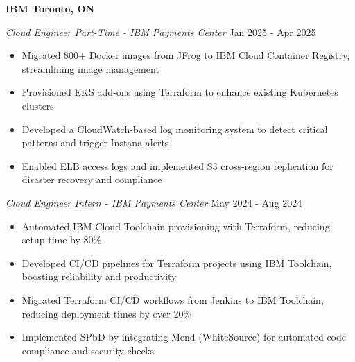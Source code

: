 \textbf{IBM \hfill Toronto, ON}\par
\textit{Cloud Engineer Part-Time - IBM Payments Center} \hfill Jan 2025 - Apr 2025

\begin{itemize}
  \item Migrated 800+ Docker images from JFrog to IBM Cloud Container Registry, streamlining image management
  \item Provisioned EKS add-ons using Terraform to enhance existing Kubernetes clusters
  \item Developed a CloudWatch-based log monitoring system to detect critical patterns and trigger Instana alerts
  \item Enabled ELB access logs and implemented S3 cross-region replication for disaster recovery and compliance
\end{itemize}
\vspace{0.1cm} \par

\textit{Cloud Engineer Intern - IBM Payments Center} \hfill May 2024 - Aug 2024

\begin{itemize}
  \item Automated IBM Cloud Toolchain provisioning with Terraform, reducing setup time by 80\%
  \item Developed CI/CD pipelines for Terraform projects using IBM Toolchain, boosting reliability and productivity
  \item Migrated Terraform CI/CD workflows from Jenkins to IBM Toolchain, reducing deployment times by over 20\%
  \item Implemented SPbD by integrating Mend (WhiteSource) for automated code compliance and security checks
\end{itemize}
\vspace{0.2cm} \par

